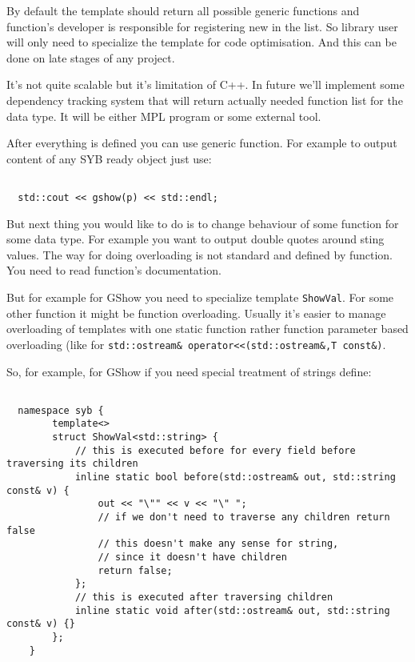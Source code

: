 \documentclass[a4paper]{article}
\begin{document}
By default the template should return all possible generic functions and function's developer
is responsible for registering new in the list. So library user will only need to specialize 
the template for code optimisation. And this can be done on late stages of any project. 

It's not quite scalable but it's limitation of C++. In future we'll implement some dependency 
tracking system that will return actually needed function list for the data type. It will be
either MPL program or some external tool.

After everything is defined you can use generic function. For example to output content of 
any SYB ready object just use:

\begin{lstlisting}

  std::cout << gshow(p) << std::endl;

\end{lstlisting}

But next thing you would like to do is to change behaviour of some function for some data type.
For example you want to output double quotes around sting values. The way for doing overloading
is not standard and defined by function. You need to read function's documentation.

But for example for GShow you need to specialize template \lstinline{ShowVal}. For 
some other function it might be function overloading. Usually it's easier to manage overloading
of templates with one static function rather function parameter based overloading (like for
\lstinline{std::ostream& operator<<(std::ostream&,T const&)}.

So, for example, for GShow if you need special treatment of strings define:

\begin{lstlisting}
	
  namespace syb {
		template<>
		struct ShowVal<std::string> {
			// this is executed before for every field before traversing its children
			inline static bool before(std::ostream& out, std::string const& v) {
				out << "\"" << v << "\" ";
				// if we don't need to traverse any children return false
				// this doesn't make any sense for string, 
				// since it doesn't have children
				return false;
			};
			// this is executed after traversing children
			inline static void after(std::ostream& out, std::string const& v) {}
		};
	}

\end{lstlisting}
\end{document}
